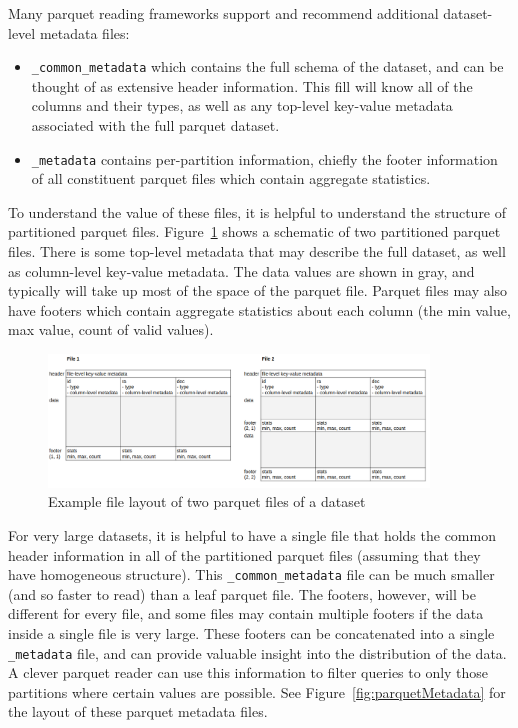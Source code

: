 \documentclass[11pt,a4paper]{ivoa}
\begin{document}
   Many parquet reading frameworks support and recommend additional dataset-level metadata files:
   \begin{itemize}
    \item \texttt{\_common\_metadata} which contains the full schema of the dataset, and can be thought of as extensive header information. This fill will know all of the columns and their types, as well as any top-level key-value metadata associated with the full parquet dataset.
    \item \texttt{\_metadata} contains per-partition information, chiefly the footer information of all constituent parquet files which contain aggregate statistics.
\end{itemize}

To understand the value of these files, it is helpful to understand the structure of partitioned parquet files. 
Figure~\ref{fig:partitionedParquet} shows a schematic of two partitioned parquet files. There is some top-level metadata that may describe the full dataset, as well as column-level key-value metadata.
The data values are shown in gray, and typically will take up most of the space of the parquet file. Parquet files may also have footers which contain aggregate statistics about each column (the min value, max value, count of valid values).
\begin{figure}
\centering
\includegraphics[width=0.9\textwidth]{leaf_files.png}
\caption{Example file layout of two parquet files of a dataset}
\label{fig:partitionedParquet}
\end{figure}

For very large datasets, it is helpful to have a single file that holds the common header information in all of the partitioned parquet files (assuming that they have homogeneous structure).
This \texttt{\_common\_metadata} file can be much smaller (and so faster to read) than a leaf parquet file.
The footers, however, will be different for every file, and some files may contain multiple footers if the data inside a single file is very large.
These footers can be concatenated into a single \texttt{\_metadata} file, and can provide valuable insight into the distribution of the data. 
A clever parquet reader can use this information to filter queries to only those partitions where certain values are possible.
See Figure~\ref{fig:parquetMetadata} for the layout of these parquet metadata files.
\end{document}
